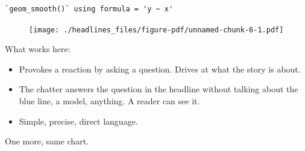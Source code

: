 \documentclass[
  letterpaper,
  DIV=11,
  numbers=noendperiod]{scrreprt}
\providecommand{\tightlist}{%
  \setlength{\itemsep}{0pt}\setlength{\parskip}{0pt}}\usepackage{longtable,booktabs,array}
\begin{document}
\begin{verbatim}
`geom_smooth()` using formula = 'y ~ x'
\end{verbatim}

\begin{figure}[H]

{\centering \texttt{[image: ./headlines\_files/figure-pdf/unnamed-chunk-6-1.pdf]}

}

\end{figure}

What works here:

\begin{itemize}
\tightlist
\item
  Provokes a reaction by asking a question. Drives at what the story is
  about.
\item
  The chatter answers the question in the headline without talking about
  the blue line, a model, anything. A reader can see it.
\item
  Simple, precise, direct language.
\end{itemize}

One more, same chart.
\end{document}
